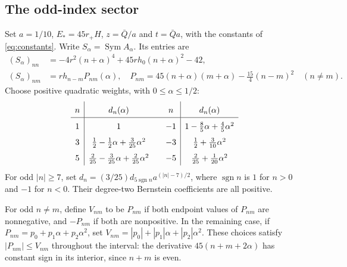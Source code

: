 \documentclass[a4paper,11pt]{article}
\numberwithin{equation}{section}
\theoremstyle{definition}
\theoremstyle{remark}
\newcommand{\Sym}{\operatorname{Sym}}
\begin{document}
\subsection{The odd-index sector}\label{subsec:odd-bloch}
Set $a=1/10$, $E_*=45r_+H$, $z=\bar Q/a$ and $t=\bar Qa$, with the constants of \eqref{eq:constants}. Write $S_\alpha=\Sym A_\alpha$. Its entries are
\begin{align}
 (S_\alpha)_{nn}&=-4r^2(n+\alpha)^4+45rh_0(n+\alpha)^2-42,\label{eq:odd-diag}\\
 (S_\alpha)_{nm}&=rh_{n-m}P_{nm}(\alpha),\quad
 P_{nm}=45(n+\alpha)(m+\alpha)-\tfrac{15}{4}(n-m)^2\quad(n\ne m).
 \label{eq:odd-off}
\end{align}
Choose positive quadratic weights, with $0\le\alpha\le1/2$:
\begin{equation}\label{eq:odd-weights}
\renewcommand{\arraystretch}{1.6}
\begin{array}{c|c@{\qquad}c|c}
 n&d_n(\alpha)&n&d_n(\alpha)\\\hline
 1&1&-1&1-\frac85\alpha+\frac45\alpha^2\\
 3&\frac12-\frac12\alpha+\frac3{25}\alpha^2&-3&\frac12+\frac3{10}\alpha^2\\
 5&\frac2{25}-\frac3{25}\alpha+\frac2{25}\alpha^2&-5&\frac2{25}+\frac1{20}\alpha^2
\end{array}
\end{equation}
For odd $|n|\ge7$, set $d_n=(3/25)d_{5\operatorname{sgn}n}a^{(|n|-7)/2}$, where $\operatorname{sgn}n$ is $1$ for $n>0$ and $-1$ for $n<0$. Their degree-two Bernstein coefficients are all positive.

For odd $n\ne m$, define $V_{nm}$ to be $P_{nm}$ if both endpoint values of $P_{nm}$ are nonnegative, and $-P_{nm}$ if both are nonpositive. In the remaining case, if $P_{nm}=p_0+p_1\alpha+p_2\alpha^2$, set $V_{nm}=|p_0|+|p_1|\alpha+|p_2|\alpha^2$. These choices satisfy $|P_{nm}|\le V_{nm}$ throughout the interval: the derivative $45(n+m+2\alpha)$ has constant sign in its interior, since $n+m$ is even.
\end{document}
